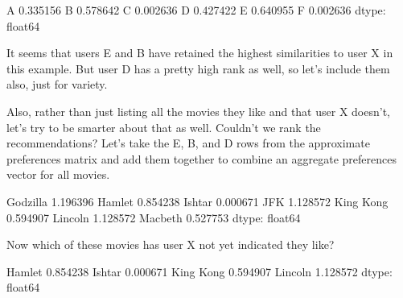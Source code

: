 \documentclass[letterpaper,10pt,english]{jupyterBook}
\begin{document}
\begin{sphinxVerbatim}[commandchars=\\\{\}]
A    0.335156
B    0.578642
C   \PYGZhy{}0.002636
D    0.427422
E    0.640955
F   \PYGZhy{}0.002636
dtype: float64
\end{sphinxVerbatim}

\sphinxAtStartPar
It seems that users E and B have retained the highest similarities to user X in this example.  But user D has a pretty high rank as well, so let’s include them also, just for variety.

\sphinxAtStartPar
Also, rather than just listing all the movies they like and that user X doesn’t, let’s try to be smarter about that as well.  Couldn’t we rank the recommendations?  Let’s take the E, B, and D rows from the approximate preferences matrix and add them together to combine an aggregate preferences vector for all movies.

\begin{sphinxVerbatim}[commandchars=\\\{\}]
  \PYG{p}{[}\PYG{p}{[}\PYG{p}{]}\PYG{p}{]}
  
\end{sphinxVerbatim}

\begin{sphinxVerbatim}[commandchars=\\\{\}]
Godzilla     1.196396
Hamlet       0.854238
Ishtar      \PYGZhy{}0.000671
JFK          1.128572
King Kong    0.594907
Lincoln      1.128572
Macbeth      0.527753
dtype: float64
\end{sphinxVerbatim}

\sphinxAtStartPar
Now which of these movies has user X not yet indicated they like?

\begin{sphinxVerbatim}[commandchars=\\\{\}]
\PYG{p}{[}\PYG{p}{]}
\end{sphinxVerbatim}

\begin{sphinxVerbatim}[commandchars=\\\{\}]
Hamlet       0.854238
Ishtar      \PYGZhy{}0.000671
King Kong    0.594907
Lincoln      1.128572
dtype: float64
\end{sphinxVerbatim}
\end{document}
